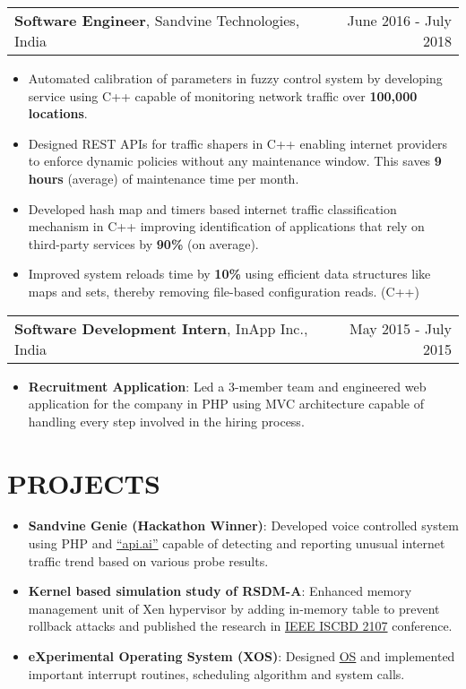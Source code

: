 \documentclass[12pt]{article}
\makeatletter
\newcommand{\resumeItem}[2]{
  \item{
    \textbf{#1}{: #2 \vspace{-2pt}}
  }
}
\newcommand{\resumeExpHeading}[3]{
    \vspace{-1pt}
    \begin{tabular*}{\textwidth}{l@{\extracolsep{\fill}}r}
      \textbf{\large#1}{#2} & #3 \\
    \end{tabular*}
}
\newcommand{\resumeSubItem}[2]{\resumeItem{#1}{#2}\vspace{-4pt}}
\newcommand{\resumeSubHeadingListStart}{\begin{itemize}[leftmargin=*]}
\newcommand{\resumeSubHeadingListEnd}{\end{itemize}}
\newcommand{\normalListItem}[1]{\item{#1}\vspace{-6pt}}
\makeatother
\begin{document}
    \resumeExpHeading
      {Software Engineer}{, Sandvine Technologies, India} {June 2016 - July 2018} 
      \resumeSubHeadingListStart
        \normalListItem
        {Automated calibration of parameters in fuzzy control system by developing service using C++ capable of monitoring network traffic over \textbf{100,000 locations}.}  
        \normalListItem
          {Designed REST APIs for traffic shapers in C++ enabling internet providers to enforce dynamic policies without any maintenance window. This saves \textbf{9 hours} (average) of maintenance time per month.}  
        \normalListItem
          {Developed hash map and timers based internet traffic classification mechanism in C++ improving identification of applications that rely on third-party services by \textbf{90\%} (on average).}
        \normalListItem
          {Improved system reloads time by \textbf{10\%} using efficient data structures like maps and sets, thereby removing file-based configuration reads. (C++)}
      \resumeSubHeadingListEnd
\vspace{7pt}
    \resumeExpHeading
      {Software Development Intern}{, InApp Inc., India}{May 2015 - July 2015}
      \resumeSubHeadingListStart
        \resumeSubItem{Recruitment Application}
          {Led a 3-member team and engineered web application for the company in PHP using MVC architecture capable of handling every step involved in the hiring process.}
      \resumeSubHeadingListEnd
  
\section{PROJECTS}
  \resumeSubHeadingListStart
    \resumeSubItem{Sandvine Genie (Hackathon Winner)}
          {Developed voice controlled system using PHP and \href{https://dialogflow.com/}{``api.ai''} capable of detecting and reporting unusual internet traffic trend based on various probe results.}
    \resumeSubItem{Kernel based simulation study of RSDM-A}
      {Enhanced memory management unit of Xen hypervisor by adding in-memory table to prevent rollback attacks and  published the research in \href{https://ieeexplore.ieee.org/document/8181523/}{IEEE ISCBD 2107} conference.}
    \resumeSubItem{eXperimental Operating System (XOS)}
      {Designed \href{http://xosnitc.github.io/}{OS} and implemented important interrupt routines, scheduling algorithm and system calls.}
    \resumeSubHeadingListEnd
\end{document}
